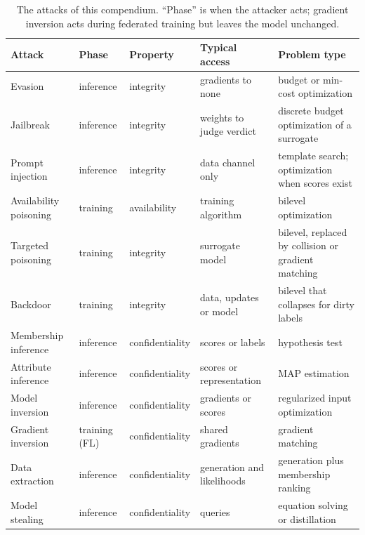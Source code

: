 \documentclass[10pt,a4paper]{extarticle}
\theoremstyle{definition}
\begin{document}
\begin{table}[h]
\centering
\small
\renewcommand{\arraystretch}{1.15}
\begin{tabularx}{\textwidth}{@{}l l l X X@{}}
\toprule
Attack & Phase & Property & Typical access & Problem type \\
\midrule
Evasion & inference & integrity & gradients to none & budget or min-cost optimization \\
Jailbreak & inference & integrity & weights to judge verdict & discrete budget optimization of a surrogate \\
Prompt injection & inference & integrity & data channel only & template search; optimization when scores exist \\
Availability poisoning & training & availability & training algorithm & bilevel optimization \\
Targeted poisoning & training & integrity & surrogate model & bilevel, replaced by collision or gradient matching \\
Backdoor & training & integrity & data, updates or model & bilevel that collapses for dirty labels \\
Membership inference & inference & confidentiality & scores or labels & hypothesis test \\
Attribute inference & inference & confidentiality & scores or representation & MAP estimation \\
Model inversion & inference & confidentiality & gradients or scores & regularized input optimization \\
Gradient inversion & training (FL) & confidentiality & shared gradients & gradient matching \\
Data extraction & inference & confidentiality & generation and likelihoods & generation plus membership ranking \\
Model stealing & inference & confidentiality & queries & equation solving or distillation \\
\bottomrule
\end{tabularx}
\caption{The attacks of this compendium. \enquote{Phase} is when the attacker acts; gradient inversion acts during federated training but leaves the model unchanged.}
\end{table}



\end{document}
